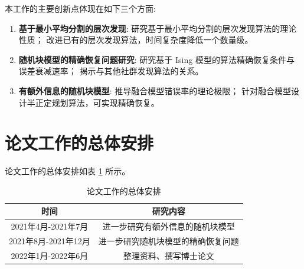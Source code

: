 \documentclass{ctexart}
\begin{document}
本工作的主要创新点体现在如下三个方面:
\begin{enumerate}
\item \textbf{基于最小平均分割的层次发现}:
研究基于最小平均分割的层次发现算法的理论性质；
改进已有的层次发现算法，时间复杂度降低一个数量级。
\item \textbf{随机块模型的精确恢复问题研究}:
研究基于 Ising 模型的算法精确恢复条件与误差衰减速率；
揭示与其他社群发现算法的关系。
\item \textbf{有额外信息的随机块模型}:
推导融合模型错误率的理论极限；
针对融合模型设计半正定规划算法，可实现精确恢复。
\end{enumerate}
\section{论文工作的总体安排}
论文工作的总体安排如表 \ref{tab} 所示。
\begin{table}[!ht]
		\centering
	\begin{tabular}{cc}
		\toprule
		时间 & 研究内容 \\
		\hline
		2021年4月-2021年7月 & 进一步研究有额外信息的随机块模型\\
		2021年8月-2021年12月 & 进一步研究随机块模型的精确恢复问题\\
		2022年1月-2022年6月 & 整理资料、撰写博士论文\\
		\toprule		
	\end{tabular}
	\caption{论文工作的总体安排}\label{tab}
	\end{table}


\end{document}
